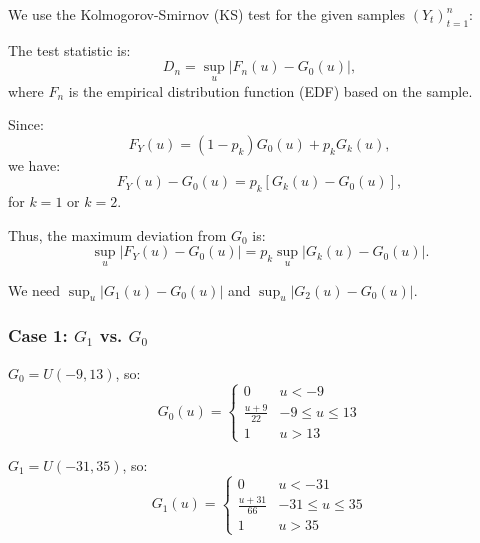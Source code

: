 \documentclass{article}
\begin{document}
We use the Kolmogorov-Smirnov (KS) test for the given samples \((Y_t)_{t=1}^n\):

The test statistic is:
\[
D_n = \sup_u |F_n(u) - G_0(u)|,
\]
where \(F_n\) is the empirical distribution function (EDF) based on the sample.


Since:
\[
F_Y(u) = (1 - p_k) G_0(u) + p_k G_k(u),
\]
we have:
\[
F_Y(u) - G_0(u) = p_k [G_k(u) - G_0(u)],
\]
for \(k=1\) or \(k=2\).

Thus, the maximum deviation from \(G_0\) is:
\[
\sup_u |F_Y(u)-G_0(u)| = p_k \sup_u |G_k(u)-G_0(u)|.
\]

We need \(\sup_u |G_1(u)-G_0(u)|\) and \(\sup_u |G_2(u)-G_0(u)|.\)

\subsubsection{Case 1: \(G_1\) vs. \(G_0\)}

\(G_0 = U(-9,13)\), so:
\[
G_0(u)=\begin{cases}
0 & u < -9 \\
\frac{u+9}{22} & -9 \le u \le 13 \\
1 & u > 13
\end{cases}
\]

\(G_1 = U(-31,35)\), so:
\[
G_1(u)=\begin{cases}
0 & u < -31 \\
\frac{u+31}{66} & -31 \le u \le 35 \\
1 & u > 35
\end{cases}
\]



\end{document}
